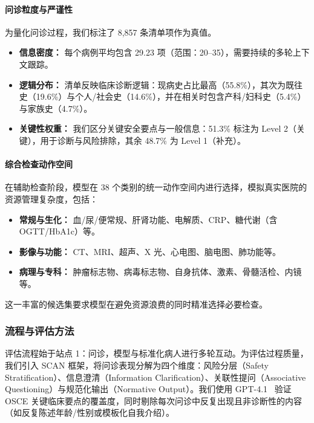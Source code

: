 \paragraph{问诊粒度与严谨性}
为量化问诊过程，我们标注了 8,857 条清单项作为真值。
\begin{itemize}
    \item \textbf{信息密度：} 每个病例平均包含 29.23 项（范围：20--35），需要持续的多轮上下文跟踪。
    \item \textbf{逻辑分布：} 清单反映临床诊断逻辑：现病史占比最高（55.8\%），其次为既往史（19.6\%）与个人/社会史（14.6\%），并在相关时包含产科/妇科史（5.4\%）与家族史（4.7\%）。
    \item \textbf{关键性权重：} 我们区分关键安全要点与一般信息：51.3\% 标注为 Level 2（关键），用于诊断与风险排除，其余 48.7\% 为 Level 1（补充）。
\end{itemize}

\paragraph{综合检查动作空间}
在辅助检查阶段，模型在 38 个类别的统一动作空间内进行选择，模拟真实医院的资源管理复杂度，包括：
\begin{itemize}
    \item \textbf{常规与生化：} 血/尿/便常规、肝肾功能、电解质、CRP、糖代谢（含 OGTT/HbA1c）等。
    \item \textbf{影像与功能：} CT、MRI、超声、X 光、心电图、脑电图、肺功能等。
    \item \textbf{病理与专科：} 肿瘤标志物、病毒标志物、自身抗体、激素、骨髓活检、内镜等。
\end{itemize}
这一丰富的候选集要求模型在避免资源浪费的同时精准选择必要检查。

\subsubsection{流程与评估方法}
评估流程始于站点 1：问诊，模型与标准化病人进行多轮互动。为评估过程质量，我们引入 SCAN 框架，将问诊表现分解为四个维度：风险分层（Safety Stratification）、信息澄清（Information Clarification）、关联性提问（Associative Questioning）与规范化输出（Normative Output）。我们使用 GPT-4.1~\cite{gpt4} 验证 OSCE 关键临床要点的覆盖度，同时剔除每次问诊中反复出现且非诊断性的内容（如反复陈述年龄/性别或模板化自我介绍）。


